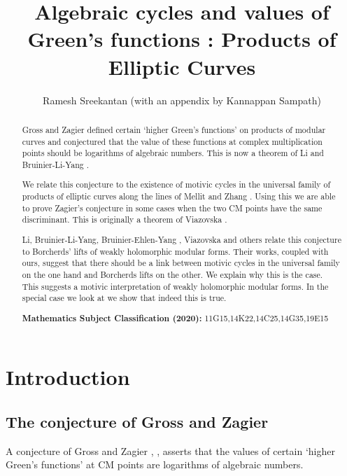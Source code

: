 \documentclass[11pt,a4paper]{article}
\title{Algebraic cycles and values of Green's functions : Products of Elliptic Curves}
\author{Ramesh Sreekantan (with an appendix by Kannappan Sampath)}
\begin{document}
	\baselineskip=17pt

\maketitle
\begin{abstract}
	
	Gross and Zagier defined certain `higher Green's functions' on products of modular curves and conjectured that the value of these functions at complex multiplication points should be logarithms of algebraic numbers. This is now a theorem of Li \cite{li} and Bruinier-Li-Yang \cite{BLY}.
	
	We relate this conjecture to the existence of motivic cycles in the universal family of products of elliptic curves along the lines of Mellit \cite{mell} and Zhang \cite{zhan}. Using this we are able to prove Zagier's conjecture in some cases when the two CM points have the same discriminant. This is originally a theorem of Viazovska \cite{viaz}. 
		
	 Li, Bruinier-Li-Yang, Bruinier-Ehlen-Yang \cite{BEY}, Viazovska \cite{viaz} and others relate this conjecture to Borcherds' lifts of weakly holomorphic modular forms. Their works, coupled with ours,  suggest that there should be a link between motivic cycles in the universal family on the one hand and Borcherds lifts on the other. We explain why this is the case. This suggests a motivic interpretation of weakly holomorphic modular forms.  In the special case we look at we show that indeed this is true. 
	
\vspace{\baselineskip}
	{\bf Mathematics Subject Classification (2020):} 11G15,14K22,14C25,14G35,19E15
	
	
	
\end{abstract}



\tableofcontents


\section{Introduction}

\subsection{The conjecture of Gross and Zagier}

A conjecture of Gross and Zagier \cite{grza}, \cite{GKZ}, \cite{zagiICM} asserts that the values of certain `higher Green's functions' at CM points are logarithms of algebraic numbers. 
\end{document}
